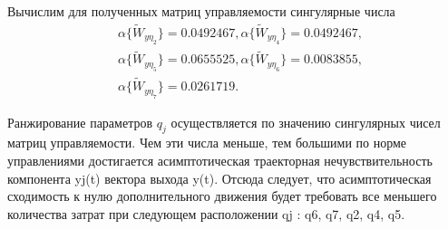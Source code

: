 Вычислим для полученных матриц управляемости сингулярные числа
\begin{align}\label{singul_nums}
	&\alpha\{\tilde{W}_{y \eta_{2}}\} = 0.0492467,
	\alpha\{\tilde{W}_{y \eta_{4}}\} = 0.0492467,\\	
	&\alpha\{\tilde{W}_{y \eta_{5}}\} = 0.0655525,	
	\alpha\{\tilde{W}_{y \eta_{6}}\} = 0.0083855,\\		
	&\alpha\{\tilde{W}_{y \eta_{7}}\} = 0.0261719.
		\label{singul_nums_end}
\end{align}


Ранжирование параметров $q_j$ осуществляется по значению сингулярных чисел матриц управляемости. 
Чем эти числа меньше, тем большими по норме управлениями достигается асимптотическая траекторная нечувствительность компонента yj(t) вектора выхода y(t). Отсюда следует, что асимптотическая сходимость к нулю дополнительного движения будет требовать все меньшего количества затрат при следующем расположении qj : q6, q7, q2, q4, q5.



\newpage